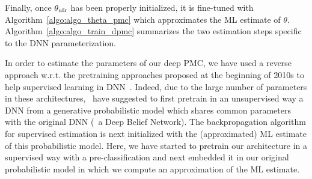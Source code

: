 Finally, once $\theta_{\mathrm{ufr}}$ has been properly initialized, it is fine-tuned with  Algorithm~\ref{algo:algo_theta_pmc} which approximates the ML estimate of $\theta$. 
Algorithm~\ref{algo:algo_train_dpmc} summarizes the two estimation steps specific to the DNN parameterization.

\begin{remark}
In order to estimate the parameters 
of our deep PMC, we have used a reverse approach w.r.t. the pretraining approaches proposed at the beginning of 2010s to help
supervised learning in DNN~\citep{erhan2010does}.
Indeed, due to the large number of parameters in these architectures,~\citep{Mohamed-DBN, Glorot, deep-SPM} 
have suggested to first pretrain in an unsupervised way a DNN from a generative probabilistic model which shares common parameters with the original DNN
(\eg~a Deep Belief Network). The backpropagation algorithm for supervised estimation is 
next initialized with the
(approximated) ML estimate of this probabilistic model.
Here, we have started to pretrain our architecture in a supervised
way with a pre-classification and
next embedded it in our original probabilistic model in which we compute an approximation
of the ML estimate. 
\end{remark}


